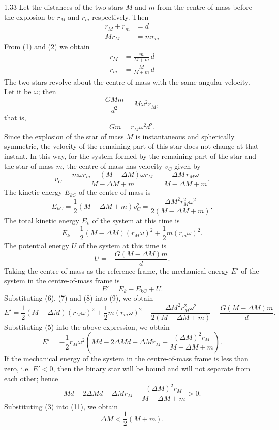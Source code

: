 \begin{solution}{1.33}
Let the distances of the two stars $M$ and $m$ from the centre of mass before the explosion be $r_M$ and $r_m$ respectively. Then
\begin{align}
r_M+r_m &= d \tag{1}\\
Mr_M &= mr_m \tag{2}
\end{align}
From (1) and (2) we obtain
\begin{align}
r_M &= \frac{m}{M+m}\,d \tag{3}\\
r_m &= \frac{M}{M+m}\,d \tag{4}
\end{align}
The two stars revolve about the centre of mass with the same angular velocity. Let it be $\omega$; then
\[
\frac{GMm}{d^2}=M\omega^2r_M,
\]
that is,
\begin{equation}
Gm=r_M\omega^2d^2. \tag{5}
\end{equation}
Since the explosion of the star of mass $M$ is instantaneous and spherically symmetric, the velocity of the remaining part of this star does not change at that instant. In this way, for the system formed by the remaining part of the star and the star of mass $m$, the centre of mass has velocity $v_C$ given by
\[
v_C=\frac{m\omega r_m-(M-\Delta M)\omega r_M}{M-\Delta M+m}
=\frac{\Delta M\,r_M\omega}{M-\Delta M+m}.
\]
The kinetic energy $E_{kC}$ of the centre of mass is
\begin{equation}
E_{kC}=\frac{1}{2}(M-\Delta M+m)v_C^2
=\frac{\Delta M^2r_M^2\omega^2}{2(M-\Delta M+m)}. \tag{6}
\end{equation}
The total kinetic energy $E_k$ of the system at this time is
\begin{equation}
E_k=\frac{1}{2}(M-\Delta M)(r_M\omega)^2+\frac{1}{2}m(r_m\omega)^2. \tag{7}
\end{equation}
The potential energy $U$ of the system at this time is
\begin{equation}
U=-\frac{G(M-\Delta M)m}{d}. \tag{8}
\end{equation}
Taking the centre of mass as the reference frame, the mechanical energy $E'$ of the system in the centre-of-mass frame is
\begin{equation}
E'=E_k-E_{kC}+U. \tag{9}
\end{equation}
Substituting (6), (7) and (8) into (9), we obtain
\[
E'=\frac{1}{2}(M-\Delta M)(r_M\omega)^2+\frac{1}{2}m(r_m\omega)^2
-\frac{\Delta M^2r_M^2\omega^2}{2(M-\Delta M+m)}-\frac{G(M-\Delta M)m}{d}.
\]
Substituting (5) into the above expression, we obtain
\begin{equation}
E'=-\frac{1}{2}r_M\omega^2\left(Md-2\Delta Md+\Delta Mr_M
+\frac{(\Delta M)^2r_M}{M-\Delta M+m}\right). \tag{10}
\end{equation}
If the mechanical energy of the system in the centre-of-mass frame is less than zero, i.e. $E'<0$, then the binary star will be bound and will not separate from each other; hence
\begin{equation}
Md-2\Delta Md+\Delta Mr_M+\frac{(\Delta M)^2r_M}{M-\Delta M+m}>0. \tag{11}
\end{equation}
Substituting (3) into (11), we obtain
\[
\Delta M<\frac{1}{2}(M+m).
\]


\end{solution}

